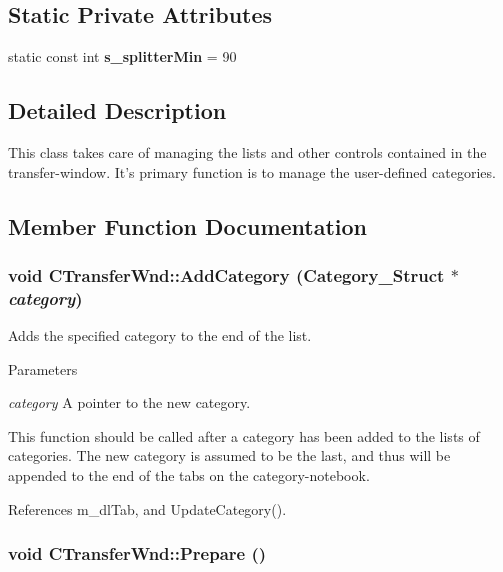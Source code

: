 \subsection*{Static Private Attributes}
\begin{DoxyCompactItemize}
\item 
static const int {\bf s\_\-splitterMin} = 90\label{classCTransferWnd_a50dce4f8ddb4599e99b59e0ca0c5734c}

\end{DoxyCompactItemize}


\subsection{Detailed Description}
This class takes care of managing the lists and other controls contained in the transfer-\/window. It's primary function is to manage the user-\/defined categories. 

\subsection{Member Function Documentation}
\subsubsection[{AddCategory}]{\setlength{\rightskip}{0pt plus 5cm}void CTransferWnd::AddCategory ({\bf Category\_\-Struct} $\ast$ {\em category})}\label{classCTransferWnd_adecfefaf92d977e677560e9bd972474c}


Adds the specified category to the end of the list. 
\begin{DoxyParams}{Parameters}
\item[{\em category}]A pointer to the new category.\end{DoxyParams}
This function should be called after a category has been added to the lists of categories. The new category is assumed to be the last, and thus will be appended to the end of the tabs on the category-\/notebook. 

References m\_\-dlTab, and UpdateCategory().
\subsubsection[{Prepare}]{\setlength{\rightskip}{0pt plus 5cm}void CTransferWnd::Prepare ()}\label{classCTransferWnd_aea33e6b3649663cd13a90e21edf84a7d}


